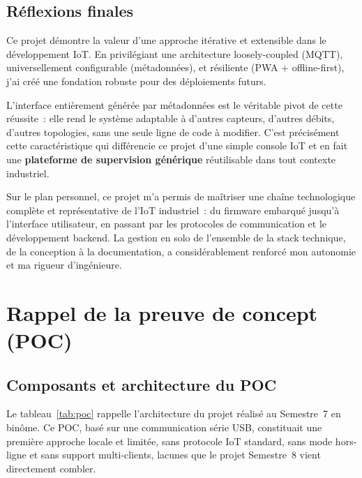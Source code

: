\documentclass[12pt, a4paper]{report}
\begin{document}
\section{R\'eflexions finales}

Ce projet d\'emontre la valeur d'une approche it\'erative et extensible
dans le d\'eveloppement IoT. En privil\'egiant une architecture
loosely-coupled (MQTT), universellement configurable (m\'etadonn\'ees),
et r\'esiliente (PWA + offline-first), j'ai cr\'e\'e une fondation
robuste pour des d\'eploiements futurs.

L'interface enti\`erement g\'en\'er\'ee par m\'etadonn\'ees est le
v\'eritable pivot de cette r\'eussite~: elle rend le syst\`eme
adaptable \`a d'autres capteurs, d'autres d\'ebits, d'autres
topologies, sans une seule ligne de code \`a modifier. C'est
pr\'ecis\'ement cette caract\'eristique qui diff\'erencie ce projet
d'une simple console IoT et en fait une \textbf{plateforme de
supervision g\'en\'erique} r\'eutilisable dans tout contexte industriel.

Sur le plan personnel, ce projet m'a permis de ma\^itriser une cha\^ine
technologique compl\`ete et repr\'esentative de l'IoT industriel~: du
firmware embarqu\'e jusqu'\`a l'interface utilisateur, en passant par
les protocoles de communication et le d\'eveloppement backend. La
gestion en solo de l'ensemble de la stack technique, de la conception
\`a la documentation, a consid\'erablement renforc\'e mon autonomie et
ma rigueur d'ing\'enieure.

\appendix

\chapter{Rappel de la preuve de concept (POC)}

\section{Composants et architecture du POC}

Le tableau~\ref{tab:poc} rappelle l'architecture du projet r\'ealis\'e
au Semestre~7 en bin\^ome. Ce POC, bas\'e sur une communication s\'erie
USB, constituait une premi\`ere approche locale et limit\'ee, sans
protocole IoT standard, sans mode hors-ligne et sans support
multi-clients, lacunes que le projet Semestre~8 vient directement
combler.
\end{document}
